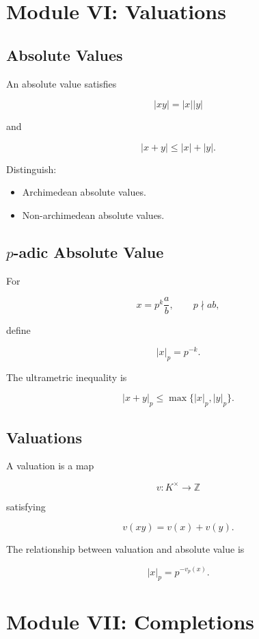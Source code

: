 \documentclass[11pt]{article}
\begin{document}
\section{Module VI: Valuations}

\subsection{Absolute Values}

An absolute value satisfies

\[
|xy|=|x||y|
\]

and

\[
|x+y|\leq |x|+|y|.
\]

Distinguish:

\begin{itemize}
    \item Archimedean absolute values.
    \item Non-archimedean absolute values.
\end{itemize}

\subsection{\texorpdfstring{$p$}{p}-adic Absolute Value}

For

\[
x=p^k\frac{a}{b},
\qquad
p\nmid ab,
\]

define

\[
|x|_p=p^{-k}.
\]

The ultrametric inequality is

\[
|x+y|_p
\leq
\max\{|x|_p,|y|_p\}.
\]

\subsection{Valuations}

A valuation is a map

\[
v:K^\times\rightarrow\mathbb{Z}
\]

satisfying

\[
v(xy)=v(x)+v(y).
\]

The relationship between valuation and absolute value is

\[
|x|_p=p^{-v_p(x)}.
\]

\section{Module VII: Completions}
\end{document}
